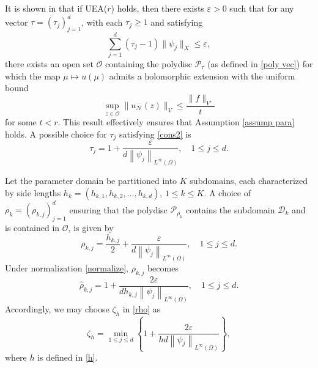 \documentclass[12pt]{article}
\theoremstyle{remark}
\theoremstyle{definition}
\numberwithin{equation}{section}
\begin{document}
It is shown in \cite{cohen2015approximation} that if UEA($r$) holds, then there exists $\varepsilon>0$ such that for any vector $\tau=(\tau_{j})_{j=1}^d$, with each $\tau_j \geq 1$ and satisfying
\begin{equation}
    \sum_{j=1}^d (\tau_{j}-1) \|\psi_j\|_X \leq \varepsilon,
    \label{cons2}
\end{equation}
there exists an open set $\mathcal{O}$ containing the polydisc $\mathcal{P}_{\tau}$ (as defined in \eqref{poly vec}) for which the map $\mu \mapsto u(\mu)$ admits a holomorphic extension with the uniform bound
\begin{equation}
    \sup_{z \in \mathcal{O}} \|u_{\mathcal{N}}(z)\|_V \leq \frac{\|f\|_{V'}}{t}
\end{equation}
for some $t<r$. This result effectively ensures that Assumption \ref{assump para} holds. A possible choice for $\tau_j$ satisfying \eqref{cons2} is
\begin{equation}
    \tau_j=1+\frac{\varepsilon}{d\left\|\psi_j\right\|_{L^{\infty}(\Omega)}}, \quad 1\leq j \leq d.
\end{equation}

Let the parameter domain be partitioned into $K$ subdomains, each characterized by side lengths  $h_k=(h_{k,1},h_{k,2},...,h_{k,d})$, $1 \leq k \leq K$. A choice of $\rho_{k}=(\rho_{k,j})_{j=1}^d$ ensuring that the polydisc $\mathcal{P}_{\rho_k}$ contains the subdomain $\mathcal{D}_k$ and is contained in $\mathcal{O}$, is given by
\begin{equation}
    \rho_{k,j}=\frac{h_{k,j}}{2}+\frac{\varepsilon}{d\left\|\psi_j\right\|_{L^{\infty}(\Omega)}}, \quad 1\leq j \leq d.
\end{equation}
Under normalization \eqref{normalize}, $\rho_{k,j}$ becomes 
\begin{equation}
    \hat \rho_{k,j}=1+\frac{2\varepsilon}{dh_{k,j}\left\|\psi_j\right\|_{L^{\infty}(\Omega)}}, \quad 1\leq j \leq d.
\end{equation}
Accordingly, we may choose $\zeta_h$ in \eqref{rho} as
\begin{equation}
    \zeta_h=\min_{1\leq j \leq d}\left\{1+\frac{2\varepsilon}{hd\left\|\psi_j\right\|_{L^{\infty}(\Omega)}}\right\},
\end{equation}
where $h$ is defined in \eqref{h}.






\end{document}
